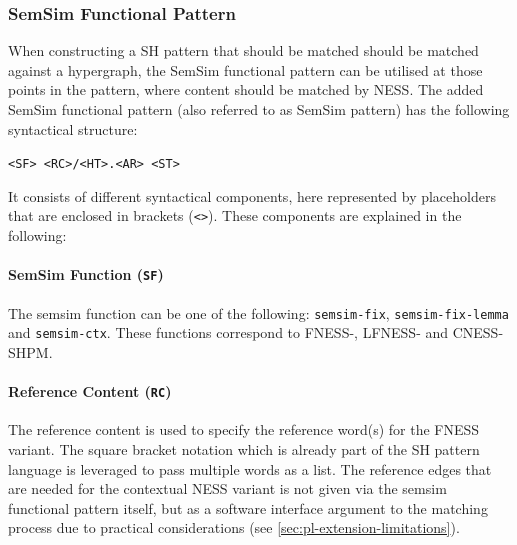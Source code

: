 \documentclass[11pt]{scrreprt}
\begin{document}
\subsubsection{SemSim Functional Pattern}
When constructing a SH pattern that should be matched should be matched against a hypergraph, the SemSim functional pattern can be utilised at those points in the pattern, where content should be matched by NESS. The added SemSim functional pattern (also referred to as SemSim pattern) has the following syntactical structure:


\begin{center}
	\texttt{<SF> <RC>/<HT>.<AR> <ST>}\
\end{center}

It consists of different syntactical components, here represented by placeholders that are enclosed in brackets (\texttt{<>}). These components are explained in the following:

\paragraph{SemSim Function (\texttt{SF})}
 The semsim function can be one of the following: \texttt{semsim-fix}, \texttt{semsim-fix-lemma} and \texttt{semsim-ctx}. These functions correspond to FNESS-, LFNESS- and CNESS-SHPM.
 

\paragraph{Reference Content (\texttt{RC})} 
The reference content is used to specify the reference word(s) for the  FNESS variant. The square bracket notation which is already part of the SH pattern language is leveraged to pass multiple words as a list. The reference edges that are needed for the contextual NESS variant is not given via the semsim functional pattern itself, but as a software interface argument to the matching process due to practical considerations (see \cref{sec:pl-extension-limitations}).
\end{document}
